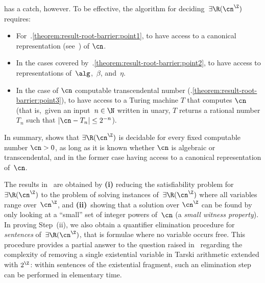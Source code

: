\noindent
{} has a catch, however.
To be effective, the algorithm for deciding~$\exists\R(\ipow{\cn})$
requires: 
\begin{itemize}
  \item For~.\ref{theorem:result-root-barrier:point1},
  to have access to a canonical representation (see~) of $\cn$.
  \item In the cases covered
  by~.\ref{theorem:result-root-barrier:point2},
  to have access to representations of~$\alg$,~$\beta$, and~$\eta$.
  \item In the case of $\cn$ computable transcendental number
  (.\ref{theorem:result-root-barrier:point3}),
  to have access to a Turing machine $T$ that computes $\cn$ (that is,~given an
  input~$n \in \N$ written in unary, $T$ returns a rational number $T_n$ such
  that $\abs{\cn-T_n} \leq 2^{-n}$).
\end{itemize}
In summary,  shows that $\exists\R(\ipow{\cn})$ is
decidable for every fixed computable number $\cn > 0$, as long as it is known
whether $\cn$ is algebraic or transcendental, and in the former case having
access to a canonical representation of~$\cn$.


The results in~ are obtained by
\textbf{(i)} reducing the satisfiability problem for~$\exists\R(\ipow{\cn})$ to the
problem of solving instances of~$\exists\R(\ipow{\cn})$ where all variables
range over~$\ipow{\cn}$, and \textbf{(ii)}~showing that a solution over $\ipow{\cn}$ can
be found by only looking at a ``small'' set of integer powers of~$\cn$ (a
\emph{small witness property}). In proving Step~(ii), we also obtain a
quantifier elimination procedure for \emph{sentences}
of~$\exists\R(\ipow{\cn})$, that is formulae where no variable occurs free. This
procedure provides a partial answer to the question raised in~\cite{AvigadY07}
regarding the complexity of removing a single existential variable
in Tarski arithmetic extended with $\ipow{2}$:
within sentences of the existential fragment, such an elimination step 
can be performed in elementary time.

